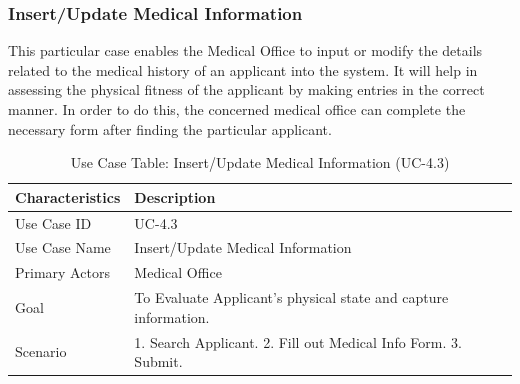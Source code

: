 \subsubsection{Insert/Update Medical Information}
This particular case enables the Medical Office to input or modify the details related to the medical history of an applicant into the system. It will help in assessing the physical fitness of the applicant by making entries in the correct manner. In order to do this, the concerned medical office can complete the necessary form after finding the particular applicant.
\begin{table}[H]
    \centering
    \small
    \renewcommand{\arraystretch}{1.4}
    \caption{Use Case Table: Insert/Update Medical Information (UC-4.3)} %
    \label{tab:medical-info-update}
    \begin{tabularx}{\textwidth}{|l|X|}
        \hline
        \rowcolor[gray]{0.9} {Characteristics} & {Description} \\ \hline
        Use Case ID & UC-4.3 \\ \hline
        Use Case Name & Insert/Update Medical Information \\ \hline
        Primary Actors & Medical Office \\ \hline
        Goal & To Evaluate Applicant’s physical state and capture information. \\ \hline
        Scenario & 1. Search Applicant. 2. Fill out Medical Info Form. 3. Submit. \\ \hline
    \end{tabularx}
\end{table}
\FloatBarrier